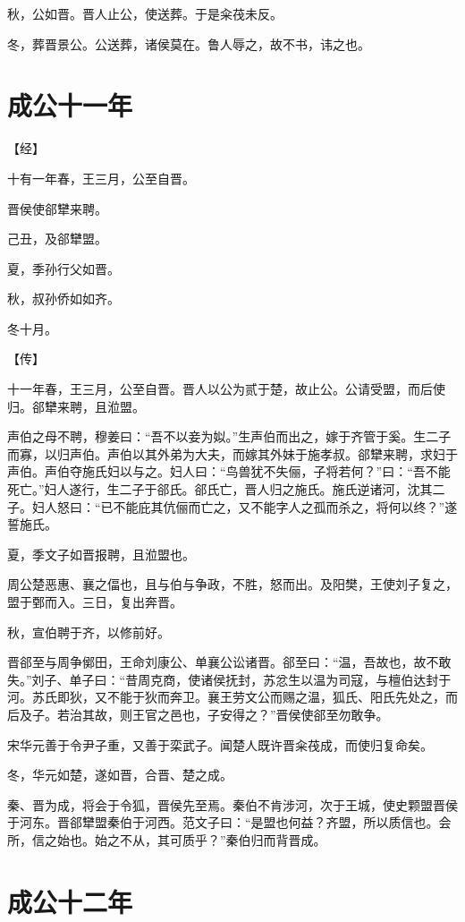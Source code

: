 \documentclass[a4paper,12pt,UTF8,twoside]{ctexbook}
\begin{document}
秋，公如晋。晋人止公，使送葬。于是籴茷未反。

冬，葬晋景公。公送葬，诸侯莫在。鲁人辱之，故不书，讳之也。


\section{成公十一年}



【经】

十有一年春，王三月，公至自晋。

晋侯使郤犫来聘。

己丑，及郤犫盟。

夏，季孙行父如晋。

秋，叔孙侨如如齐。

冬十月。

【传】

十一年春，王三月，公至自晋。晋人以公为贰于楚，故止公。公请受盟，而后使归。郤犫来聘，且涖盟。

声伯之母不聘，穆姜曰：“吾不以妾为姒。”生声伯而出之，嫁于齐管于奚。生二子而寡，以归声伯。声伯以其外弟为大夫，而嫁其外妹于施孝叔。郤犫来聘，求妇于声伯。声伯夺施氏妇以与之。妇人曰：“鸟兽犹不失俪，子将若何？”曰：“吾不能死亡。”妇人遂行，生二子于郤氏。郤氏亡，晋人归之施氏。施氏逆诸河，沈其二子。妇人怒曰：“已不能庇其伉俪而亡之，又不能字人之孤而杀之，将何以终？”遂誓施氏。

夏，季文子如晋报聘，且涖盟也。

周公楚恶惠、襄之偪也，且与伯与争政，不胜，怒而出。及阳樊，王使刘子复之，盟于鄄而入。三日，复出奔晋。

秋，宣伯聘于齐，以修前好。

晋郤至与周争鄇田，王命刘康公、单襄公讼诸晋。郤至曰：“温，吾故也，故不敢失。”刘子、单子曰：“昔周克商，使诸侯抚封，苏忿生以温为司寇，与檀伯达封于河。苏氏即狄，又不能于狄而奔卫。襄王劳文公而赐之温，狐氏、阳氏先处之，而后及子。若治其故，则王官之邑也，子安得之？”晋侯使郤至勿敢争。

宋华元善于令尹子重，又善于栾武子。闻楚人既许晋籴茷成，而使归复命矣。

冬，华元如楚，遂如晋，合晋、楚之成。

秦、晋为成，将会于令狐，晋侯先至焉。秦伯不肯涉河，次于王城，使史颗盟晋侯于河东。晋郤犫盟秦伯于河西。范文子曰：“是盟也何益？齐盟，所以质信也。会所，信之始也。始之不从，其可质乎？”秦伯归而背晋成。


\section{成公十二年}
\end{document}
